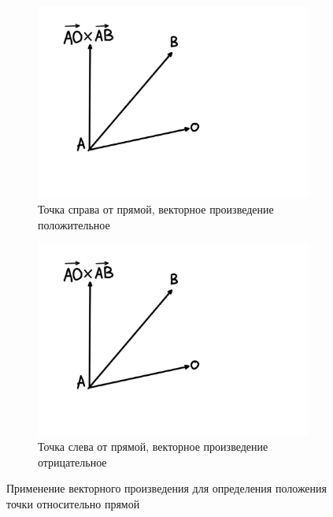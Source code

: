 \begin{figure}[H]
	\hfill
	\begin{subfigure}{.45\textwidth}
		\centering
		\includegraphics[width=\linewidth,page=1,trim={2cm 5cm 11cm 2cm}]{img/gm}
		\caption{Точка справа от прямой, векторное произведение положительное}
	\end{subfigure}
	\hfill
	\begin{subfigure}{.45\textwidth}
		\centering
		\includegraphics[width=\linewidth,page=2,trim={2cm 0cm 8cm 1cm}]{img/gm}
		\caption{Точка слева от прямой, векторное произведение отрицательное}
	\end{subfigure}
	\hfill
	\caption{Применение векторного произведения для определения положения точки относительно прямой}
	\label{vec_example}
\end{figure}

